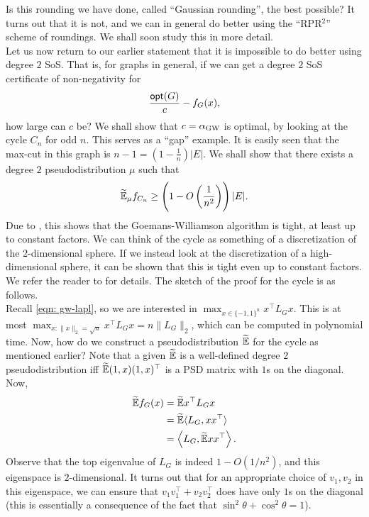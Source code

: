 	Is this rounding we have done, called ``Gaussian rounding'', the best possible? It turns out that it is not, and we can in general do better using the ``RPR$^2$'' scheme of roundings. We shall soon study this in more detail.\\

	Let us now return to our earlier statement that it is impossible to do better using degree $2$ SoS. That is, for graphs in general, if we can get a degree $2$ SoS certificate of non-negativity for
	\[ \frac{\mathsf{opt}(G)}{c} - f_G(x), \]
	how large can $c$ be? We shall show that $c = \alpha_{\text{GW}}$ is optimal, by looking at the cycle $C_n$ for odd $n$. This serves as a ``gap'' example. It is easily seen that the max-cut in this graph is $n-1 = \left( 1 - \frac{1}{n} \right) |E|$. We shall show that there exists a degree $2$ pseudodistribution $\mu$ such that
	\[ \widetilde{\mathbb{E}}_\mu f_{C_n} \ge \left( 1 - O\left(\frac{1}{n^2}\right) \right) |E|. \]
	Due to , this shows that the Goemans-Williamson algorithm is tight, at least up to constant factors. We can think of the cycle as something of a discretization of the $2$-dimensional sphere. If we instead look at the discretization of a high-dimensional sphere, it can be shown that this is tight even up to constant factors. We refer the reader to \cite{gw-tight-feige-schechtman} for details. The sketch of the proof for the cycle is as follows.\\
	Recall \cref{eqn: gw-lapl}, so we are interested in $\max_{x \in \{-1,1\}^n} x^\top L_G x$. This is at most $\max_{x : \|x\|_2 = \sqrt{n}} x^\top L_G x = n\|L_G\|_2$, which can be computed in polynomial time. Now, how do we construct a pseudodistribution $\widetilde{\mathbb{E}}$ for the cycle as mentioned earlier? Note that a given $\widetilde{\mathbb{E}}$ is a well-defined degree $2$ pseudodistribution iff $\widetilde{\mathbb{E}} (1,x) (1,x)^\top$ is a PSD matrix with $1$s on the diagonal. Now,
	\begin{align*}
		\widetilde{\mathbb{E}} f_G(x) &= \widetilde{\mathbb{E}} x^\top L_G x \\
			&= \widetilde{\mathbb{E}} \langle L_G , xx^\top \rangle \\
			&= \left\langle L_G , \widetilde{\mathbb{E}} xx^\top \right\rangle.
	\end{align*}
	Observe that the top eigenvalue of $L_G$ is indeed $1 - O(1/n^2)$, and this eigenspace is $2$-dimensional. It turns out that for an appropriate choice of $v_1,v_2$ in this eigenspace, we can ensure that $v_1v_1^\top + v_2v_2^\top$ does have only $1$s on the diagonal (this is essentially a consequence of the fact that $\sin^2\theta+\cos^2\theta = 1$).

